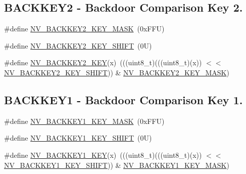 \subsection*{B\+A\+C\+K\+K\+E\+Y2 -\/ Backdoor Comparison Key 2.}
\begin{DoxyCompactItemize}
\item 
\#define \mbox{\hyperlink{group___n_v___register___masks_ga5bf8822b0b59a321d9b5c30eb1618704}{N\+V\+\_\+\+B\+A\+C\+K\+K\+E\+Y2\+\_\+\+K\+E\+Y\+\_\+\+M\+A\+SK}}~(0x\+F\+F\+U)
\item 
\#define \mbox{\hyperlink{group___n_v___register___masks_ga408b1083508e784cba76d5be9b147a84}{N\+V\+\_\+\+B\+A\+C\+K\+K\+E\+Y2\+\_\+\+K\+E\+Y\+\_\+\+S\+H\+I\+FT}}~(0\+U)
\item 
\#define \mbox{\hyperlink{group___n_v___register___masks_gaca7b47cbaa596b76f92f926f40dcc80a}{N\+V\+\_\+\+B\+A\+C\+K\+K\+E\+Y2\+\_\+\+K\+EY}}(x)~(((uint8\+\_\+t)(((uint8\+\_\+t)(x)) $<$$<$ \mbox{\hyperlink{group___n_v___register___masks_ga408b1083508e784cba76d5be9b147a84}{N\+V\+\_\+\+B\+A\+C\+K\+K\+E\+Y2\+\_\+\+K\+E\+Y\+\_\+\+S\+H\+I\+FT}})) \& \mbox{\hyperlink{group___n_v___register___masks_ga5bf8822b0b59a321d9b5c30eb1618704}{N\+V\+\_\+\+B\+A\+C\+K\+K\+E\+Y2\+\_\+\+K\+E\+Y\+\_\+\+M\+A\+SK}})
\end{DoxyCompactItemize}
\subsection*{B\+A\+C\+K\+K\+E\+Y1 -\/ Backdoor Comparison Key 1.}
\begin{DoxyCompactItemize}
\item 
\#define \mbox{\hyperlink{group___n_v___register___masks_ga6cd05d78b113df7f3cb0d11d29931666}{N\+V\+\_\+\+B\+A\+C\+K\+K\+E\+Y1\+\_\+\+K\+E\+Y\+\_\+\+M\+A\+SK}}~(0x\+F\+F\+U)
\item 
\#define \mbox{\hyperlink{group___n_v___register___masks_ga71418f17e11f902066ca404fbe473aef}{N\+V\+\_\+\+B\+A\+C\+K\+K\+E\+Y1\+\_\+\+K\+E\+Y\+\_\+\+S\+H\+I\+FT}}~(0\+U)
\item 
\#define \mbox{\hyperlink{group___n_v___register___masks_gac336f640b5b887647407bd036aabb060}{N\+V\+\_\+\+B\+A\+C\+K\+K\+E\+Y1\+\_\+\+K\+EY}}(x)~(((uint8\+\_\+t)(((uint8\+\_\+t)(x)) $<$$<$ \mbox{\hyperlink{group___n_v___register___masks_ga71418f17e11f902066ca404fbe473aef}{N\+V\+\_\+\+B\+A\+C\+K\+K\+E\+Y1\+\_\+\+K\+E\+Y\+\_\+\+S\+H\+I\+FT}})) \& \mbox{\hyperlink{group___n_v___register___masks_ga6cd05d78b113df7f3cb0d11d29931666}{N\+V\+\_\+\+B\+A\+C\+K\+K\+E\+Y1\+\_\+\+K\+E\+Y\+\_\+\+M\+A\+SK}})
\end{DoxyCompactItemize}
